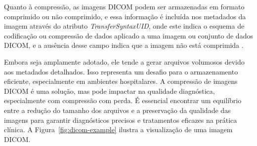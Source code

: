 Quanto à compressão, as imagens \acrshort{DICOM} podem ser armazenadas em formato comprimido ou não comprimido, e essa informação é incluída nos metadados da imagem através do atributo \textit{TransferSyntaxUID}, onde este indica o esquema de codificação ou compressão de dados aplicado a uma imagem ou conjunto de dados \acrshort{DICOM}, e a ausência desse campo indica que a imagem não está comprimida \cite{DICOM}.

Embora seja amplamente adotado, ele tende a gerar arquivos volumosos devido aos metadados detalhados. Isso representa um desafio para o armazenamento eficiente, especialmente em ambientes hospitalares. A compressão de imagens \acrshort{DICOM} é uma solução, mas pode impactar na qualidade diagnóstica, especialmente com compressão com perda. É essencial encontrar um equilíbrio entre a redução do tamanho dos arquivos e a preservação da qualidade das imagens para garantir diagnósticos precisos e tratamentos eficazes na prática clínica. A Figura~\ref{fig:dicom-example} ilustra a visualização de uma imagem \acrshort{DICOM}.

\begin{figure}[H]
	\centering
\end{figure}

